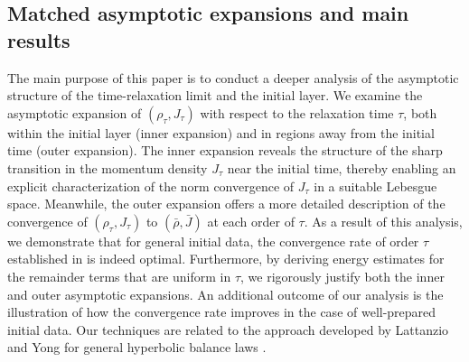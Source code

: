 \documentclass[english]{amsart}
\theoremstyle{plain}
\theoremstyle{definition}
\theoremstyle{remark}
\theoremstyle{plain}
\theoremstyle{plain}
\theoremstyle{plain}
\numberwithin{equation}{section}
\begin{document}
\subsection{Matched asymptotic expansions and main results}

The main purpose of this paper is to conduct a deeper analysis of the asymptotic structure of the time-relaxation limit and the initial layer. We examine the asymptotic expansion of $(\rho_\tau, J_\tau)$ with respect to the relaxation time $\tau$, both within the initial layer (inner expansion) and in regions away from the initial time (outer expansion). The inner expansion reveals the structure of the sharp transition in the momentum density $J_\tau$ near the initial time, thereby enabling an explicit characterization of the norm convergence of $J_\tau$ in a suitable Lebesgue space. Meanwhile, the outer expansion offers a more detailed description of the convergence of $(\rho_\tau, J_\tau)$ to $(\bar\rho, \bar J)$ at each order of $\tau$. As a result of this analysis, we demonstrate that for general initial data, the convergence rate of order $\tau$ established in \cite{AMZ3} is indeed optimal. Furthermore, by deriving energy estimates for the remainder terms that are uniform in $\tau$, we rigorously justify both the inner and outer asymptotic expansions. An additional outcome of our analysis is the illustration of how the convergence rate improves in the case of well-prepared initial data. Our techniques are related to the approach developed by Lattanzio and Yong for general hyperbolic balance laws \cite{LY}.
\end{document}
